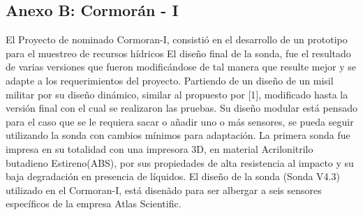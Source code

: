 \appendixpageoff
\begin{appendices}







\chapter*{Anexo B: Cormor\'an - I}
\label{appendix: cormoran}
\setcounter{figure}{0}    
El Proyecto de nominado Cormoran-I, consistió en el desarrollo de un prototipo para el muestreo de recursos hídricos 
El diseño final de la sonda, fue el resultado de varias versiones que fueron modificándose de tal manera que resulte mejor y se adapte a los requerimientos del proyecto.
Partiendo de un diseño de un misil militar por su dise\~no din\'amico, similar al propuesto por [1], modificado hasta la versión final con el cual se realizaron las pruebas. Su diseño modular est\'a pensado para el caso que se le requiera sacar o añadir uno o m\'as sensores, se pueda seguir utilizando la sonda con cambios mínimos para adaptación.
La primera sonda fue impresa en su totalidad con una impresora 3D, en material Acrilonitrilo butadieno Estireno(ABS), por sus propiedades de alta resistencia al impacto y su baja degradación en presencia de líquidos. 
El diseño de la sonda (Sonda V4.3) utilizado en el Cormoran-I, está disen\~ado para ser albergar a seis sensores específicos de la empresa Atlas Scientific.


\end{appendices}
